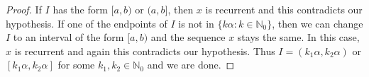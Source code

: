 \documentclass[11pt,reqno]{amsart}
\newtheorem{proposition}[theorem]{Proposition}
\theoremstyle{definition}
\theoremstyle{plain}
\newcommand{\N}{\mathbb{N}}
\newcommand{\T}{\mathbb{T}}
\newcommand{\AuthornoteR}[2]{{\sf\small\color{blue}{[#1: #2]}}}
\newcommand{\rp}{\AuthornoteR{R}}
\begin{document}
\begin{proof}



If $I$ has the form $[a, b)$ or $(a, b]$, then $x$ is recurrent and this contradicts our hypothesis.
If one of the endpoints of $I$ is not in $\{k \alpha: k \in \N_0\}$, then we can change $I$ to an interval of the form $[a, b)$ and the sequence $x$ stays the same. In this case, $x$ is recurrent and again this contradicts our hypothesis. Thus $I = (k_1 \alpha, k_2 \alpha)$ or $[k_1 \alpha, k_2 \alpha]$ for some $k_1, k_2 \in \N_0$ and we are done.
\end{proof}

\end{document}
